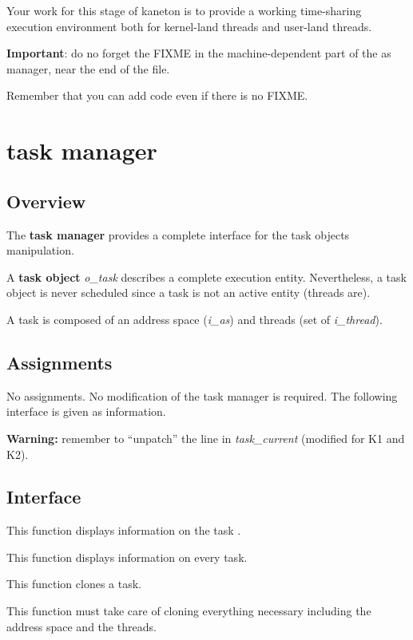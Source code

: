 Your work for this stage of kaneton is to provide a working
time-sharing execution environment both for kernel-land threads and
user-land threads.

\textbf{Important}: do no forget the FIXME in the machine-dependent
part of the as manager, near the end of the file.

Remember that you can add code even if there is no FIXME.


%
%

\newpage

\section{\textbf{task} manager}

\subsection*{Overview}

The \textbf{task manager} provides a complete interface for the
task objects manipulation.

A \textbf{task object} \textit{o\_task} describes a complete
execution entity. Nevertheless, a task object is never scheduled
since a task is not an active entity (threads are).

A task is composed of an address space (\textit{i\_as}) and threads
(set of \textit{i\_thread}).

\subsection*{Assignments}

No assignments. No modification of the task manager is
required. The following interface is given as information.

\textbf{Warning:} remember to ``unpatch'' the line in
\emph{task\_current} (modified for K1 and K2).

\subsection*{Interface}

{
  This function displays information on the task .
}

{
  This function displays information on every task.
}

{
  This function clones a task.

  This function must take care of cloning everything necessary
  including the address space and the threads.
}

